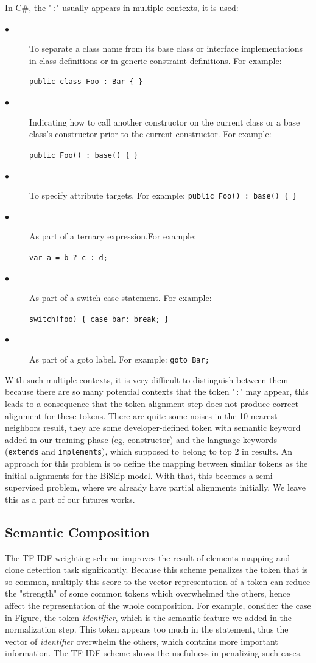 In C\#, the "\texttt{:}" usually appears in multiple contexts, it is used:

\begin{description}
	\item [$\bullet$] To separate a class name from its base class or interface implementations in class definitions or in generic constraint definitions. For example: 
	
	\texttt{public class Foo : Bar \{ \}}
	\item [$\bullet$] Indicating how to call another constructor on the current class or a base class's constructor prior to the current constructor. For example: 
	
	\texttt{public Foo() : base() \{ \}}
	\item [$\bullet$] To specify attribute targets. For example: \texttt{public Foo() : base() \{ \}}
	\item [$\bullet$] As part of a ternary expression.For example:
	
	\texttt{var a = b ? c : d;}
	\item [$\bullet$] As part of a switch case statement. For example:
	
	\texttt{switch(foo) \{ case bar: break; \}}
	\item [$\bullet$] As part of a goto label. For example:
	\texttt{goto Bar;}
	
\end{description}

With such multiple contexts, it is very difficult to distinguish between them because there are so many potential contexts that the token "\texttt{:}" may appear, this leads to a consequence that  the token alignment step does not produce correct alignment for these tokens. There are quite some noises in the 10-nearest neighbors result, they are some developer-defined token with semantic keyword added in our training phase (eg, constructor) and the language keywords (\texttt{extends} and \texttt{implements}), which supposed to belong to top 2 in results. An approach for this problem is to define the mapping between similar tokens as the initial alignments for the BiSkip model. With that, this becomes a semi-supervised problem, where we already have partial alignments initially. We leave this as a part of our futures works.

\subsection{Semantic Composition}
The TF-IDF weighting scheme improves the result of elements mapping and clone detection task significantly. Because this scheme penalizes the token that is so common, multiply this score to the vector representation of a token can reduce the "strength" of some common tokens which overwhelmed the others, hence affect the representation of the whole composition. For example, consider the case in Figure, the token \textit{identifier}, which is the semantic feature we added in the normalization step. This token appears too much in the statement, thus the vector of \textit{identifier} overwhelm the others, which contains more important information. The TF-IDF scheme shows the usefulness in penalizing such cases.


